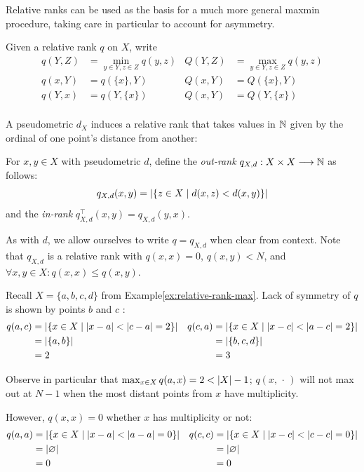 \documentclass[
]{article}
\begin{document}
Relative ranks can be used as the basis for a much more general maxmin
procedure, taking care in particular to account for asymmetry.

Given a relative rank \(q\) on \(X\), write \begin{align*}
    q(Y,Z) &= \min_{y\in Y,z\in Z}{q(y,z)} & Q(Y,Z) &= \max_{y\in Y,z\in Z}{q(y,z)} \\
    q(x,Y) &= q(\{x\},Y)                   & Q(x,Y) &= Q(\{x\},Y) \\
    q(Y,x) &= q(Y,\{x\})                   & Q(x,Y) &= Q(Y,\{x\}) \\
\end{align*}

A pseudometric \(d_X\) induces a relative rank that takes values in
\(\mathbb{N}\) given by the ordinal of one point's distance from another:

\begin{definition}
    For $x,y\in X$ with pseudometric $d$, define the \emph{out-rank} $q_{X,d} : X \times X \longrightarrow \mathbb{N}$ as follows:
    \begin{equation}\label{eqn:out-rank}
        q_{X,d}(x,y)=\abs{\{z\in X \mid d(x,z) < d(x,y)\}}%
    \end{equation}
    and the \emph{in-rank} $q_{X,d}^\top(x,y) = q_{X,d}(y,x)$.
\end{definition}

As with \(d\), we allow ourselves to write \(q=q_{X,d}\) when clear from
context. Note that \(q_{X,d}\) is a relative rank with \(q(x,x)=0\),
\(q(x,y) < N\), and \(\forall x,y \in X : q(x,x) \leq q(x,y)\).

\begin{example}\label{ex:relative-rank}
    Recall $X=\{a,b,c,d\}$ from Example\nbs\ref{ex:relative-rank-max}.
    Lack of symmetry of $q$ is shown by points $b$ and $c$ :
    \begin{align*}
        q(a,c) &= \lvert \{x \in X \mid \lvert x-a\rvert < \lvert c-a\rvert = 2\}\rvert &
        q(c,a) &= \lvert \{x \in X \mid \lvert x-c\rvert < \lvert a-c\rvert = 2\}\rvert \\
               &= \lvert \{a, b\}\rvert &&= \lvert \{b, c, d\}\rvert \\
               &= 2 &&= 3
    \end{align*}

    Observe in particular that $\max_{x\in X}{q(a,x)}=2<\lvert X\rvert-1$; $q(x,\,\cdot\,)$ will not max out at $N-1$ when the most distant points from $x$ have multiplicity.

    However, $q(x,x) = 0$ whether $x$ has multiplicity or not:
    \begin{align*}
        q(a,a) &= \lvert \{x \in X \mid \lvert x-a\rvert < \lvert a-a\rvert = 0\}\rvert &
        q(c,c) &= \lvert \{x \in X \mid \lvert x-c\rvert < \lvert c-c\rvert = 0\}\rvert \\
               &= \lvert \varnothing\rvert &&= \lvert \varnothing\rvert \\
               &= 0 &&= 0
    \end{align*}
\end{example}
\end{document}
